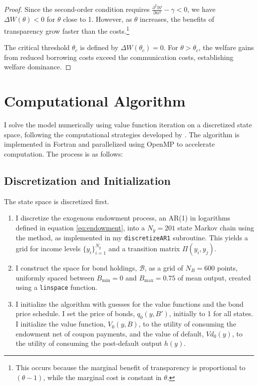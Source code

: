 \documentclass[12pt]{article}
\theoremstyle{plain}
\begin{document}
\begin{proof}
	Since the second-order condition requires $\frac{\partial^2
			\mathcal{W}}{\partial \alpha^2} - \gamma < 0$, we have $\Delta W(\theta) < 0$
	for $\theta$ close to 1. However, as $\theta$ increases, the benefits of
	transparency grow faster than the costs.\footnote{This occurs because the
		marginal benefit of transparency is proportional to $(\theta-1)$, while the
		marginal cost is constant in $\theta$.}

	The critical threshold $\theta_c$ is defined by $\Delta W(\theta_c) = 0$. For
	$\theta > \theta_c$, the welfare gains from reduced borrowing costs exceed the
	communication costs, establishing welfare dominance.
\end{proof}

\clearpage

\section{Computational Algorithm}\label{app:computations}

I solve the model numerically using value function iteration on a discretized
state space, following the computational strategies developed by
\citep{MIHALACHEOREEF2024}. The algorithm is implemented in Fortran and
parallelized using OpenMP to accelerate computation. The process is as follows:

\subsection{Discretization and Initialization}
The state space is discretized first.
\begin{enumerate}
	\item I discretize the exogenous endowment process, an AR(1) in logarithms defined in
	      equation \eqref{eq:endowment}, into a $N_y=201$ state Markov chain using the
	      \citep{Tauchen1986} method, as implemented in my \texttt{discretizeAR1}
	      subroutine. This yields a grid for income levels $\{y_i\}_{i=1}^{N_y}$ and a
	      transition matrix $\Pi(y_i, y_j)$.
	\item I construct the space for bond holdings, $\mathcal{B}$, as a grid of $N_B =
		      600$ points, uniformly spaced between $B_{\min}=0$ and $B_{\max}=0.75$ of mean
	      output, created using a \texttt{linspace} function.
	\item I initialize the algorithm with guesses for the value functions and the bond
	      price schedule. I set the price of bonds, $q_0(y, B')$, initially to 1 for all
	      states. I initialize the value function, $V_0(y, B)$, to the utility of
	      consuming the endowment net of coupon payments, and the value of default,
	      $Vd_0(y)$, to the utility of consuming the post-default output $h(y)$.
\end{enumerate}
\end{document}
